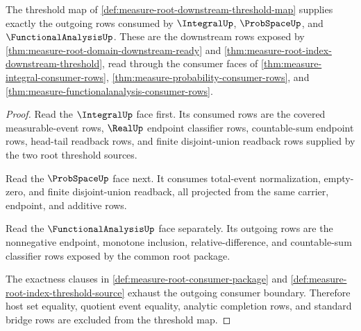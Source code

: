 \begin{theorem}
\label{thm:measure-root-threshold-map-consumer-unblock}
The threshold map of
\autoref{def:measure-root-downstream-threshold-map} supplies exactly the
outgoing rows consumed by $\IntegralUp$, $\ProbSpaceUp$, and
$\FunctionalAnalysisUp$. These are the downstream rows exposed by
\autoref{thm:measure-root-domain-downstream-ready} and
\autoref{thm:measure-root-index-downstream-threshold}, read through the
consumer faces of \autoref{thm:measure-integral-consumer-rows},
\autoref{thm:measure-probability-consumer-rows}, and
\autoref{thm:measure-functionalanalysis-consumer-rows}.
\end{theorem}
\begin{proof}
Read the $\IntegralUp$ face first. Its consumed rows are the covered
measurable-event rows, $\RealUp$ endpoint classifier rows, countable-sum
endpoint rows, head-tail readback rows, and finite disjoint-union readback
rows supplied by the two root threshold sources.

Read the $\ProbSpaceUp$ face next. It consumes total-event normalization,
empty-zero, and finite disjoint-union readback, all projected from the same
carrier, endpoint, and additive rows.

Read the $\FunctionalAnalysisUp$ face separately. Its outgoing rows are the
nonnegative endpoint, monotone inclusion, relative-difference, and
countable-sum classifier rows exposed by the common root package.

The exactness clauses in \autoref{def:measure-root-consumer-package} and
\autoref{def:measure-root-index-threshold-source} exhaust the outgoing
consumer boundary. Therefore host set equality, quotient event equality,
analytic completion rows, and standard bridge rows are excluded from the
threshold map.
\end{proof}
